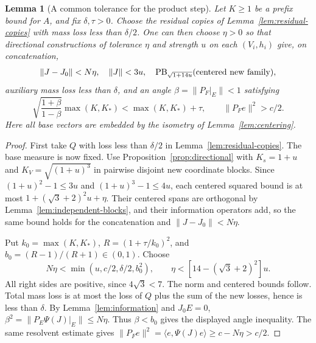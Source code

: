 \documentclass[reqno,a4paper,12pt]{amsart}
\newtheorem{lemma}[theorem]{Lemma}
\theoremstyle{definition}
\newcommand{\ip}[2]{\langle #1,#2\rangle}
\newcommand{\PB}{\operatorname{PB}}
\begin{document}
\begin{lemma}[A common tolerance for the product step]
\label{lem:product-tolerance}
Let $K\ge1$ be a prefix bound for $A$, and fix $\delta,\tau>0$.
Choose the residual copies of Lemma~\ref{lem:residual-copies} with
mass loss less than $\delta/2$. One can then choose $\eta>0$ so that
directional constructions of tolerance $\eta$ and strength $u$ on
each $(V_i,h_i)$ give, on concatenation,
\[
 \|J-J_0\|<N\eta,\quad \|J\|<3u,\quad
 \PB_{\sqrt{1+14u}}(\hbox{centered new family}),
\]
auxiliary mass loss less than $\delta$, and an angle
$\beta=\|P_F|_E\|<1$ satisfying
\[
 \sqrt{\frac{1+\beta}{1-\beta}}\max(K,K_*)<\max(K,K_*)+\tau,
 \qquad \|P_Fe\|^2>c/2.
\]
Here all base vectors are embedded by the isometry of
Lemma~\ref{lem:centering}.
\end{lemma}
\begin{proof}
First take $Q$ with loss less than $\delta/2$ in
Lemma~\ref{lem:residual-copies}. The base measure is now fixed.
Use Proposition~\ref{prop:directional} with $K_s=1+u$ and
$K_V=\sqrt{(1+u)^3}$ in pairwise disjoint new coordinate blocks.
Since $(1+u)^2-1\le3u$ and $(1+u)^3-1\le4u$,
each centered squared bound is at most
$1+(\sqrt3+2)^2u+\eta$.
Their centered spans are orthogonal by
Lemma~\ref{lem:independent-blocks}, and their information operators
add, so the same bound holds for the concatenation and
$\|J-J_0\|<N\eta$.

Put $k_0=\max(K,K_*)$,
$R=(1+\tau/k_0)^2$, and $b_0=(R-1)/(R+1)\in(0,1)$.
Choose
\[
 N\eta<\min(u,c/2,\delta/2,b_0^2),\qquad
 \eta<[14-(\sqrt3+2)^2]u.
\]
All right sides are positive, since $4\sqrt3<7$.
The norm and centered bounds follow. Total mass loss is at most the
loss of $Q$ plus the sum of the new losses, hence is less than $\delta$.
By Lemma~\ref{lem:information} and $J_0E=0$,
$\beta^2=\|P_E\Psi(J)|_E\|\le N\eta$.
Thus $\beta<b_0$ gives the displayed angle inequality.
The same resolvent estimate gives
$\|P_Fe\|^2=\ip{e}{\Psi(J)e}\ge c-N\eta>c/2$.
\end{proof}
\end{document}
